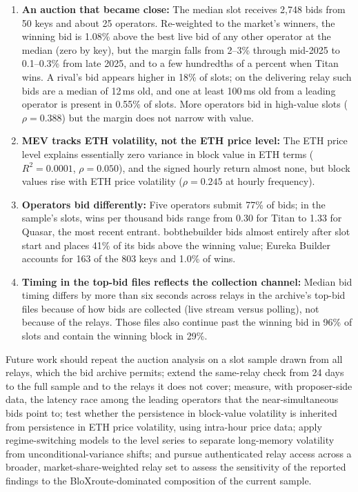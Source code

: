 \documentclass[11pt]{article}
\begin{document}
\begin{enumerate}
\item \textbf{An auction that became close:} The median slot receives 2,748
bids from 50 keys and about 25 operators. Re-weighted to the market's
winners, the winning bid is 1.08\% above the best live bid of any other
operator at the median (zero by key), but the margin falls from 2--3\%
through mid-2025 to 0.1--0.3\% from late 2025, and to a few hundredths of
a percent when Titan wins. A rival's bid appears higher in 18\% of slots; on
the delivering relay such bids are a median of 12\,ms old, and one at least
100\,ms old from a leading operator is present in 0.55\% of slots. More
operators bid in high-value slots ($\rho = 0.388$) but the margin does not
narrow with value.

\item \textbf{MEV tracks ETH volatility, not the ETH price level:} The ETH
price level explains essentially zero variance in block value in ETH terms
($R^2 = 0.0001$, $\rho = 0.050$), and the signed hourly return almost none,
but block values rise with ETH price volatility ($\rho = 0.245$ at hourly
frequency).

\item \textbf{Operators bid differently:} Five operators submit 77\% of bids;
in the sample's slots, wins per thousand bids range from 0.30 for Titan to
1.33 for Quasar, the most recent entrant. bobthebuilder bids almost
entirely after slot start and places 41\% of its bids above the winning
value; Eureka Builder accounts for 163 of the 803 keys and 1.0\% of wins.

\item \textbf{Timing in the top-bid files reflects the collection channel:}
Median bid timing differs by more than six seconds across relays in the
archive's top-bid files because of how bids are collected (live stream
versus polling), not because of the relays. Those files also continue past
the winning bid in 96\% of slots and contain the winning block in 29\%.
\end{enumerate}

Future work should repeat the auction analysis on a slot sample drawn from
all relays, which the bid archive permits; extend the same-relay check from
24 days to the full sample and to the relays it does not cover; measure, with proposer-side
data, the latency race among the leading operators that the near-simultaneous
bids point to; test whether the persistence in block-value volatility is
inherited from persistence in ETH price volatility, using intra-hour price
data; apply
regime-switching models to the level series to separate long-memory volatility
from unconditional-variance shifts; and pursue authenticated relay access across a
broader, market-share-weighted relay set to assess the sensitivity of the
reported findings to the BloXroute-dominated composition of the current sample.
\end{document}
